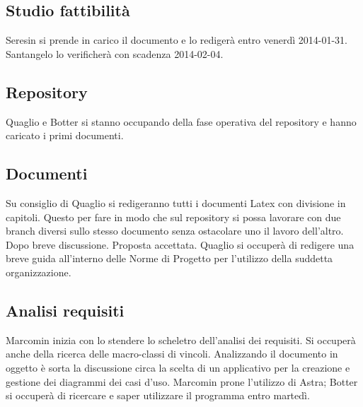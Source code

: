 \subsection{Studio fattibilità}
Seresin si prende in carico il documento e lo redigerà entro venerdì 2014-01-31. Santangelo lo verificherà con scadenza 2014-02-04.\\
\subsection{Repository}
Quaglio e Botter si stanno occupando della fase operativa del repository e hanno caricato i primi documenti.\\
\subsection{Documenti}
Su consiglio di Quaglio si redigeranno tutti i documenti Latex con divisione in capitoli. Questo per fare in modo che sul repository si possa lavorare con due branch diversi sullo stesso documento senza ostacolare uno il lavoro dell'altro. Dopo breve discussione. Proposta accettata. Quaglio si occuperà di redigere una breve guida all'interno delle Norme di Progetto per l'utilizzo della suddetta organizzazione.\\
\subsection{Analisi requisiti}
Marcomin inizia con lo stendere lo scheletro dell'analisi dei requisiti. Si occuperà anche della ricerca delle macro-classi di vincoli. Analizzando il documento in oggetto è sorta la discussione circa la scelta di un applicativo per la creazione e gestione dei diagrammi dei casi d'uso. Marcomin prone l'utilizzo di Astra; Botter si occuperà di ricercare e saper utilizzare il programma entro martedì.\\